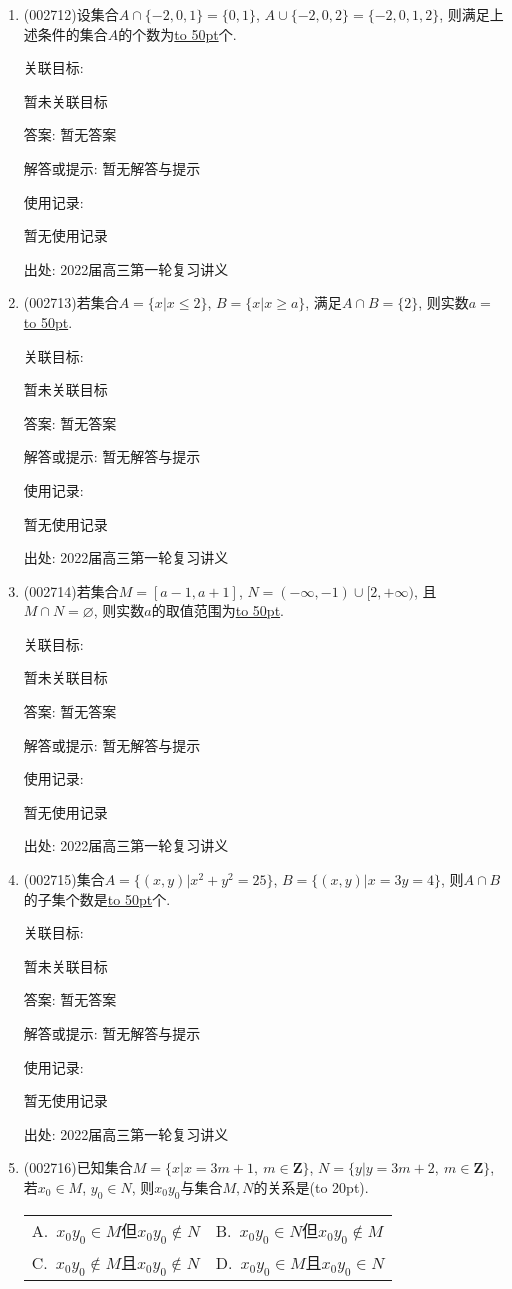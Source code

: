 \documentclass[10pt,a4paper]{article}
\newcommand{\blank}[1]{\underline{\hbox to #1pt{}}}
\newcommand{\bracket}[1]{(\hbox to #1pt{})}
\newcommand{\twoch}[4]{\par\begin{tabular}{p{.46\textwidth}p{.46\textwidth}}
A.~#1& B.~#2\\
C.~#3& D.~#4
\end{tabular}}
\begin{document}
\begin{enumerate}[1.]
关联目标:

暂未关联目标

答案: 暂无答案

解答或提示: 暂无解答与提示

使用记录:

暂无使用记录


出处: 2022届高三第一轮复习讲义
\item { (002712)}设集合$A\cap \{-2,0,1\}=\{0,1\}$, $A\cup \{-2,0,2\}=\{-2,0,1,2\}$, 则满足上述条件的集合$A$的个数为\blank{50}个.


关联目标:

暂未关联目标

答案: 暂无答案

解答或提示: 暂无解答与提示

使用记录:

暂无使用记录


出处: 2022届高三第一轮复习讲义
\item { (002713)}若集合$A=\{x|x\le 2\}$, $B=\{x|x\ge a\}$, 满足$A\cap B=\{2\}$, 则实数$a=$\blank{50}.


关联目标:

暂未关联目标

答案: 暂无答案

解答或提示: 暂无解答与提示

使用记录:

暂无使用记录


出处: 2022届高三第一轮复习讲义
\item { (002714)}若集合$M=[a-1,a+1]$, $N=(-\infty,-1)\cup [2,+\infty)$, 且$M\cap N=\varnothing$, 则实数$a$的取值范围为\blank{50}.


关联目标:

暂未关联目标

答案: 暂无答案

解答或提示: 暂无解答与提示

使用记录:

暂无使用记录


出处: 2022届高三第一轮复习讲义
\item { (002715)}集合$A=\{(x,y)|x^2+y^2=25\}$, $B=\{(x,y)|x=3y=4\}$, 则$A\cap B$的子集个数是\blank{50}个.


关联目标:

暂未关联目标

答案: 暂无答案

解答或提示: 暂无解答与提示

使用记录:

暂无使用记录


出处: 2022届高三第一轮复习讲义
\item { (002716)}已知集合$M=\{x|x=3m+1, \ m\in \mathbf{Z}\}$, $N=\{y|y=3m+2, \ m\in \mathbf{Z}\}$, 若$x_0\in M$, $y_0\in N$, 则$x_0y_0$与集合$M,N$的关系是\bracket{20}.
\twoch{$x_0y_0\in M$但$x_0y_0$$\notin N$}{$x_0y_0\in N$但$x_0y_0\notin M$}{$x_0y_0\notin M$且$x_0y_0\notin N$}{$x_0y_0$$\in M$且$x_0y_0\in N$}



\end{enumerate}
\end{document}
